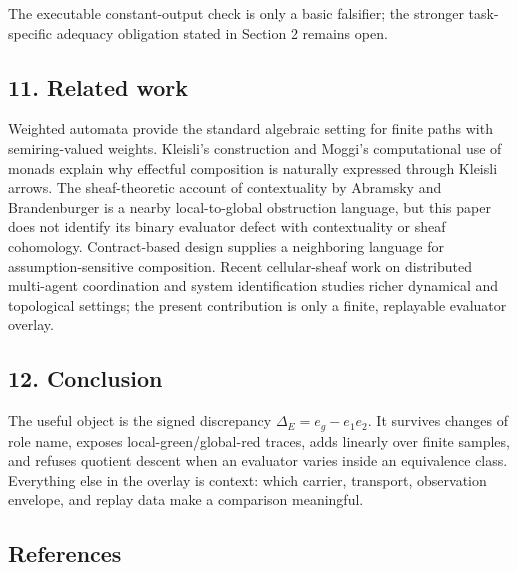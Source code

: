 \documentclass[
  11pt,
]{article}
\theoremstyle{plain}
\theoremstyle{definition}\newtheorem{definition}[theorem]{Definition}
\theoremstyle{remark}\newtheorem*{remark}{Remark}
\begin{document}
The executable constant-output check is only a basic falsifier; the stronger
task-specific adequacy obligation stated in Section 2 remains open.

\subsection{11. Related work}\label{related-work}

Weighted automata provide the standard algebraic setting for finite paths with
semiring-valued weights. Kleisli's construction and Moggi's computational use
of monads explain why effectful composition is naturally expressed through
Kleisli arrows. The sheaf-theoretic account of contextuality by Abramsky and
Brandenburger is a nearby local-to-global obstruction language, but this paper
does not identify its binary evaluator defect with contextuality or sheaf
cohomology. Contract-based design supplies a neighboring language for
assumption-sensitive composition. Recent cellular-sheaf work on distributed
multi-agent coordination and system identification studies richer dynamical
and topological settings; the present contribution is only a finite,
replayable evaluator overlay.

\subsection{12. Conclusion}\label{conclusion}

The useful object is the signed discrepancy
\(\Delta_E=e_g-e_1e_2\). It survives changes of role name, exposes
local-green/global-red traces, adds linearly over finite samples, and refuses
quotient descent when an evaluator varies inside an equivalence class.
Everything else in the overlay is context: which carrier, transport,
observation envelope, and replay data make a comparison meaningful.

\subsection{References}\label{references}
\end{document}
